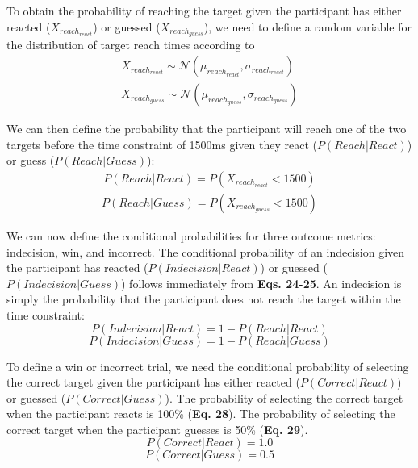 \documentclass[12pt]{article}
\newcommand\boldblue[1]{\textcolor{mydarkblue}{\textbf{#1}}}
\begin{document}
To obtain the probability of reaching the target given the participant has either reacted ($X_{reach_{react}}$) or guessed ($X_{reach_{guess}}$), we need to define a random variable for the distribution of target reach times according to
\begin{align}
    X_{reach_{react}} \sim \mathcal{N}(\mu_{reach_{react}}, \sigma_{reach_{react}}) \\
    X_{reach_{guess}} \sim \mathcal{N}(\mu_{reach_{guess}}, \sigma_{reach_{guess}})
\end{align}

We can then define the probability that the participant will reach one of the two targets before the time constraint of 1500ms given they react ($P(Reach|React)$) or guess ($P(Reach|Guess)$):
\begin{align}
    P(Reach|React) = P(X_{reach_{react}} < 1500)
\end{align}
\begin{align}
    P(Reach|Guess) = P(X_{reach_{guess}} < 1500)
\end{align}

We can now define the conditional probabilities for three outcome metrics: indecision, win, and incorrect. The conditional probability of an indecision given the participant has reacted ($P(Indecision|React)$) or guessed ($P(Indecision|Guess)$) follows immediately from \boldblue{Eqs. 24-25}. An indecision is simply the probability that the participant does not reach the target within the time constraint:
\begin{equation}
    P(Indecision|React) = 1 - P(Reach|React)
\end{equation}
\begin{equation}
    P(Indecision|Guess) = 1 - P(Reach|Guess)
\end{equation}

To define a win or incorrect trial, we need the conditional probability of selecting the correct target given the participant has either reacted ($P(Correct|React)$) or guessed ($P(Correct|Guess)$). The probability of selecting the correct target when the participant reacts is 100\% (\boldblue{Eq. 28}). The probability of selecting the correct target when the participant guesses is 50\% (\boldblue{Eq. 29}).
\begin{equation}
    P(Correct|React) = 1.0
\end{equation}
\begin{equation}
    P(Correct|Guess) = 0.5
\end{equation}
\end{document}
